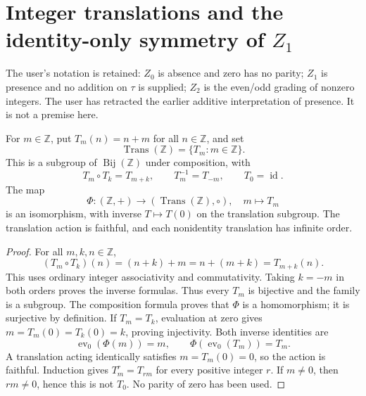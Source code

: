 \section{Integer translations and the identity-only symmetry of $Z_1$}
\label{sec:TRZ}
The user's notation is retained: $Z_0$ is absence and zero has no parity; $Z_1$ is presence and no addition on $\tau$ is supplied; $Z_2$ is the even/odd grading of nonzero integers. The user has retracted the earlier additive interpretation of presence. It is not a premise here.

\begin{theorem}
For $m\in\mathbb Z$, put $T_m(n)=n+m$ for all $n\in\mathbb Z$, and set
\[
\operatorname{Trans}(\mathbb Z)=\{T_m:m\in\mathbb Z\}.
\]
This is a subgroup of $\operatorname{Bij}(\mathbb Z)$ under composition, with
\[
T_m\circ T_k=T_{m+k},\qquad T_m^{-1}=T_{-m},\qquad T_0=\operatorname{id}.
\]
The map
\[
\Phi:(\mathbb Z,+)\longrightarrow
(\operatorname{Trans}(\mathbb Z),\circ),\quad m\longmapsto T_m
\]
is an isomorphism, with inverse $T\mapsto T(0)$ on the translation subgroup.
The translation action is faithful, and each nonidentity translation has infinite order.
\end{theorem}
\begin{proof}
For all $m,k,n\in\mathbb Z$,
\[
(T_m\circ T_k)(n)=(n+k)+m=n+(m+k)=T_{m+k}(n).
\]
This uses ordinary integer associativity and commutativity. Taking $k=-m$ in both orders proves the inverse formulas. Thus every $T_m$ is bijective and the family is a subgroup. The composition formula proves that $\Phi$ is a homomorphism; it is surjective by definition. If $T_m=T_k$, evaluation at zero gives $m=T_m(0)=T_k(0)=k$, proving injectivity. Both inverse identities are
\[
\operatorname{ev}_0(\Phi(m))=m,\qquad
\Phi(\operatorname{ev}_0(T_m))=T_m.
\]
A translation acting identically satisfies $m=T_m(0)=0$, so the action is faithful. Induction gives $T_m^r=T_{rm}$ for every positive integer $r$. If $m\ne0$, then $rm\ne0$, hence this is not $T_0$. No parity of zero has been used.
\end{proof}

